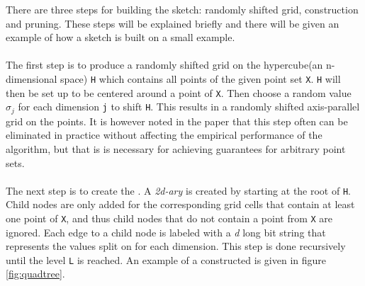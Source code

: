 There are three steps for building the sketch: randomly shifted grid, \qt{} construction and pruning. These steps will be explained briefly and there will be given an example of how a sketch is built on a small example.
\\
\\
The first step is to produce a randomly shifted grid on the hypercube(an n-dimensional space) \texttt{H} which contains all points of the given point set \texttt{X}. \texttt{H} will then be set up to be centered around a point of \texttt{X}. Then choose a random value $\sigma_j$ for each dimension \texttt{j} to shift \texttt{H}. This results in a randomly shifted axis-parallel grid on the points. It is however noted in the paper that this step often can be eliminated in practice without affecting the empirical performance of the algorithm, but that is is necessary for achieving guarantees for arbitrary point sets\cite[p. 4, "Step 1"]{wagner17}.
\\
\\
The next step is to create the \qt{}. A \textit{2d-ary} \qt{} is created by starting at the root of \texttt{H}. Child nodes are only added for the corresponding grid cells that contain at least one point of \texttt{X}, and thus child nodes that do not contain a point from \texttt{X} are ignored. Each edge to a child node is labeled with a \textit{d} long bit string that represents the values split on for each dimension. This step is done recursively until the level \texttt{L} is reached. An example of a constructed \qt{} is given in figure \ref{fig:quadtree}.

